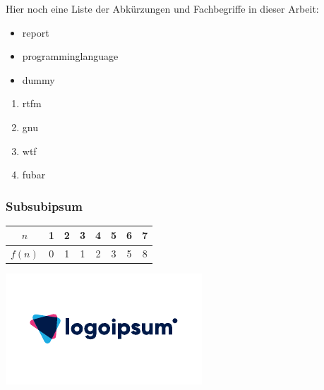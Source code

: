 Hier noch eine Liste der Abkürzungen und Fachbegriffe in dieser Arbeit:

\begin{itemize}
    \item \gls{report}
    \item \gls{programminglanguage}
    \item \gls{dummy}
\end{itemize}

\begin{enumerate}
    \item \acrshort{rtfm}
    \item \acrshort{gnu}
    \item \acrshort{wtf}
    \item \acrshort{fubar}
\end{enumerate}

\lipsum[2-4]

\newpage
\subsubsection{Subsubipsum}

\begin{table}[h]
    \centering
    \begin{tabular}{c|ccccccc}
        $n$    & 1 & 2 & 3 & 4 & 5 & 6 & 7 \\ \hline
        $f(n)$ & 0 & 1 & 1 & 2 & 3 & 5 & 8 \\
    \end{tabular}
\end{table}

\lipsum[4]

\begin{center}
    \includegraphics[width=\textwidth]{lipsum_logo_1}
\end{center}

